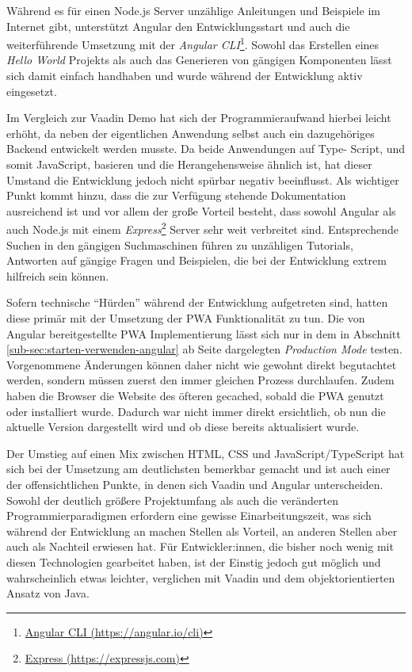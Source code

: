 \documentclass[a4paper,12pt,twoside]{scrreprt}
\begin{document}
Während es für einen Node.js Server unzählige Anleitungen und Beispiele im Internet gibt, unterstützt Angular den Entwicklungsstart und auch die weiterführende Umsetzung mit der \textit{Angular CLI}\footnote{\href{https://angular.io/cli}{Angular CLI (https://angular.io/cli)}}. Sowohl das Erstellen eines \textit{Hello World} Projekts als auch das Generieren von gängigen Komponenten lässt sich damit einfach handhaben und wurde während der Entwicklung aktiv eingesetzt.

\medskip

Im Vergleich zur Vaadin Demo hat sich der Programmieraufwand hierbei leicht erhöht, da neben der eigentlichen Anwendung selbst auch ein dazugehöriges Backend entwickelt werden musste. Da beide Anwendungen auf Type- Script, und somit JavaScript, basieren und die Herangehensweise ähnlich ist, hat dieser Umstand die Entwicklung jedoch nicht spürbar negativ beeinflusst. Als wichtiger Punkt kommt hinzu, dass die zur Verfügung stehende Dokumentation ausreichend ist und vor allem der große Vorteil besteht, dass sowohl Angular als auch Node.js mit einem \textit{Express}\footnote{\href{https://expressjs.com/}{Express (https://expressjs.com)}} Server sehr weit verbreitet sind. Entsprechende Suchen in den gängigen Suchmaschinen führen zu unzähligen Tutorials, Antworten auf gängige Fragen und Beispielen, die bei der Entwicklung extrem hilfreich sein können.

\medskip

Sofern technische \enquote{Hürden} während der Entwicklung aufgetreten sind, hatten diese primär mit der Umsetzung der \ac{PWA} Funktionalität zu tun. Die von Angular bereitgestellte \ac{PWA} Implementierung lässt sich nur in dem in Abschnitt \ref{sub-sec:starten-verwenden-angular} ab Seite \pageref{sub-sec:starten-verwenden-angular} dargelegten \textit{Production Mode} testen. Vorgenommene Änderungen können daher nicht wie gewohnt direkt begutachtet werden, sondern müssen zuerst den immer gleichen Prozess durchlaufen. Zudem haben die Browser die Website des öfteren gecached, sobald die \ac{PWA} genutzt oder installiert wurde. Dadurch war nicht immer direkt ersichtlich, ob nun die aktuelle Version dargestellt wird und ob diese bereits aktualisiert wurde.

\medskip

Der Umstieg auf einen Mix zwischen HTML, \ac{CSS} und JavaScript/TypeScript hat sich bei der Umsetzung am deutlichsten bemerkbar gemacht und ist auch einer der offensichtlichen Punkte, in denen sich Vaadin und Angular unterscheiden. Sowohl der deutlich größere Projektumfang als auch die veränderten Programmierparadigmen erfordern eine gewisse Einarbeitungszeit, was sich während der Entwicklung an machen Stellen als Vorteil, an anderen Stellen aber auch als Nachteil erwiesen hat. Für Entwickler:innen, die bisher noch wenig mit diesen Technologien gearbeitet haben, ist der Einstig jedoch gut möglich und wahrscheinlich etwas leichter, verglichen mit Vaadin und dem objektorientierten Ansatz von Java.
\end{document}

